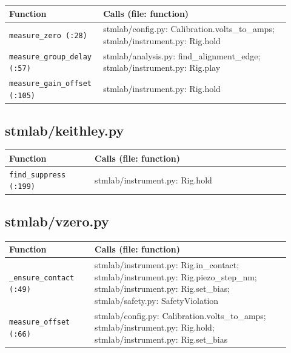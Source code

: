 \small\setlength{\LTleft}{0pt}\setlength{\LTright}{\fill}
\begin{longtable}{@{}>{\raggedright\arraybackslash}p{0.280\linewidth}>{\raggedright\arraybackslash}p{0.640\linewidth}@{}}
\toprule
\textbf{Function} & \textbf{Calls (file: function)} \\
\midrule\endhead
\texttt{measure\_\discretionary{}{}{}zero (:28)} & stmlab/config.py: Calibration.volts\_to\_amps; stmlab/instrument.py: Rig.hold \\
\texttt{measure\_\discretionary{}{}{}group\_\discretionary{}{}{}delay (:57)} & stmlab/analysis.py: find\_alignment\_edge; stmlab/instrument.py: Rig.play \\
\texttt{measure\_\discretionary{}{}{}gain\_\discretionary{}{}{}offset (:105)} & stmlab/instrument.py: Rig.hold \\
\bottomrule
\end{longtable}
\normalsize

\subsection{stmlab/keithley.py}

\small\setlength{\LTleft}{0pt}\setlength{\LTright}{\fill}
\begin{longtable}{@{}>{\raggedright\arraybackslash}p{0.280\linewidth}>{\raggedright\arraybackslash}p{0.640\linewidth}@{}}
\toprule
\textbf{Function} & \textbf{Calls (file: function)} \\
\midrule\endhead
\texttt{find\_\discretionary{}{}{}suppress (:199)} & stmlab/instrument.py: Rig.hold \\
\bottomrule
\end{longtable}
\normalsize

\subsection{stmlab/vzero.py}

\small\setlength{\LTleft}{0pt}\setlength{\LTright}{\fill}
\begin{longtable}{@{}>{\raggedright\arraybackslash}p{0.280\linewidth}>{\raggedright\arraybackslash}p{0.640\linewidth}@{}}
\toprule
\textbf{Function} & \textbf{Calls (file: function)} \\
\midrule\endhead
\texttt{\_\discretionary{}{}{}ensure\_\discretionary{}{}{}contact (:49)} & stmlab/instrument.py: Rig.in\_contact; stmlab/instrument.py: Rig.piezo\_step\_nm; stmlab/instrument.py: Rig.set\_bias; stmlab/safety.py: SafetyViolation \\
\texttt{measure\_\discretionary{}{}{}offset (:66)} & stmlab/config.py: Calibration.volts\_to\_amps; stmlab/instrument.py: Rig.hold; stmlab/instrument.py: Rig.set\_bias \\
\bottomrule
\end{longtable}
\normalsize


